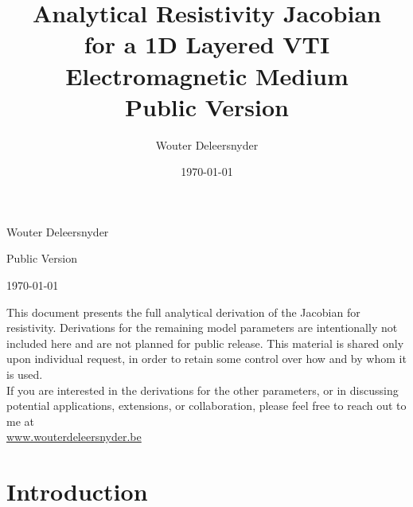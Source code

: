 \documentclass[12pt]{report}
\title{\textbf{Analytical Resistivity Jacobian\\
       for a 1D Layered VTI Electromagnetic Medium\\}
       \large Public Version}
\author{Wouter Deleersnyder}
\date{\today}
\begin{document}

\thispagestyle{empty}

\vspace*{3cm}

{\centering
	
	\vspace{2cm}
	
	{\large Wouter Deleersnyder}
	
	\vspace{0.5cm}
	
	Public Version
	
	\vspace{0.5cm}
	
	{\normalsize \today}
	
	\par}


	\vspace{5.5cm}
This document presents the full analytical derivation of the Jacobian for resistivity. Derivations for the remaining model parameters are intentionally not included here and are not planned for public release. This material is shared only upon individual request, in order to retain some control over how and by whom it is used.\\

If you are interested in the derivations for the other parameters, or in discussing potential applications, extensions, or collaboration, please feel free to reach out to me at\\ \url{www.wouterdeleersnyder.be}


\vspace*{\fill}

\newpage

\tableofcontents

\chapter{Introduction}
\end{document}
